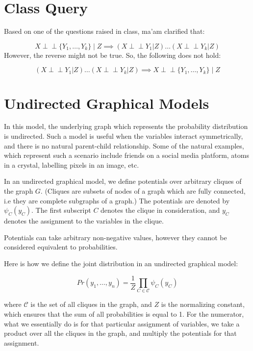 \documentclass[a4paper,12pt]{article}
\title{\cooltitle{CS726 Scribe Notes}}
\author{{\bf Saksham (22B1003), Sharvanee (22B0943), Deeksha (22B0988)} \\
\small Department of Computer Science, \\
Indian Institute of Technology Bombay \\}
\date{}
\begin{document}
\maketitle

\section{Class Query}
Based on one of the questions raised in class, ma'am clarified that:

\[X \perp\!\!\!\perp \{Y_1, \dots, Y_k\} \mid Z\implies (X \perp\!\!\!\perp Y_1 | Z) \dots (X \perp\!\!\!\perp Y_k | Z)\]
However, the reverse might not be true. So, the following does not hold:

\[(X \perp\!\!\!\perp Y_1 | Z)  \dots  (X \perp\!\!\!\perp Y_k | Z) \implies X \perp\!\!\!\perp \{Y_1, \dots, Y_k\} \mid Z\]


\section{Undirected Graphical Models}
In this model, the underlying graph which represents the probability distribution is undirected. Such a model is useful when the variables interact symmetrically, and there is no natural parent-child relationship. Some of the natural examples, which represent such a scenario include friends on a social media platform, atoms in a crystal, labelling pixels in an image, etc.

In an undirected graphical model, we define potentials over arbitrary cliques of the graph $G$. (Cliques are subsets of nodes of a graph which are fully connected, i.e they are complete subgraphs of a graph.) The potentials are denoted by $\psi_C(y_C)$. The first subscript $C$ denotes the clique in consideration, and $y_C$ denotes the assignment to the variables in the clique.

Potentials can take arbitrary non-negative values, however they cannot be considered equivalent to probabilities. 

Here is how we define the joint distribution in an undirected graphical model:

\[
Pr(y_1, \dots, y_n) = \frac{1}{Z} \prod_{C \in \mathcal{C}} \psi_C(y_C)
\]

where $\mathcal{C}$ is the set of all cliques in the graph, and $Z$ is the normalizing constant, which ensures that the sum of all probabilities is equal to 1. For the numerator, what we essentially do is for that particular assignment of variables, we take a product over all the cliques in the graph, and multiply the potentials for that assignment.
\end{document}
